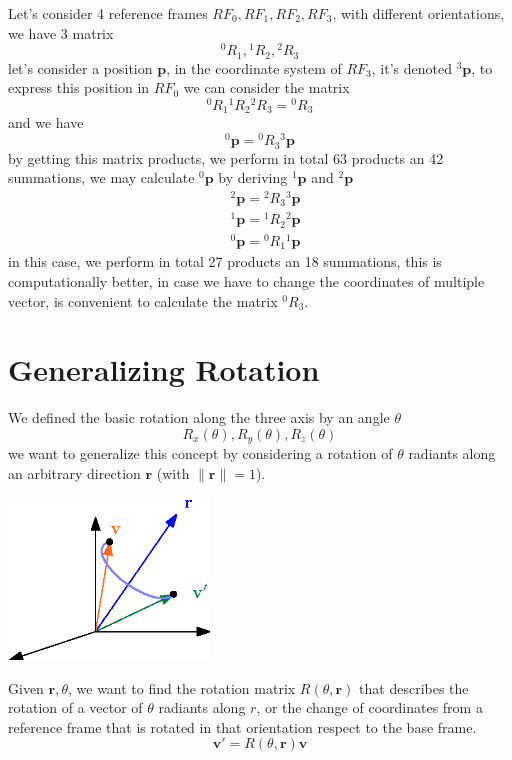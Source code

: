 \documentclass[10pt, letterpaper]{report}
\begin{document}
Let's consider 4 reference frames $RF_0,RF_1,RF_2,RF_3$, with different orientations, we have 3 matrix$${}^0R_1,{}^1R_2,{}^2R_3$$
let's consider a position $\mathbf p$, in the coordinate system of $RF_3$, it's denoted ${}^3\mathbf p$, to express this position in $RF_0$ we can consider the matrix $$ {}^0R_1{}^1R_2{}^2R_3={}^0R_3$$
and we have$$ {}^0\mathbf p={}^0R_3{}^3\mathbf p$$
by getting this matrix products, we perform in total 63 products an 42 summations, we may calculate $ {}^0\mathbf p$ by deriving ${}^1\mathbf p$ and ${}^2\mathbf p$\begin{align}
    &{}^2\mathbf p = {}^2R_3{}^3\mathbf p\\ 
    &{}^1\mathbf p = {}^1R_2{}^2\mathbf p\\ 
    &{}^0\mathbf p = {}^0R_1{}^1\mathbf p
\end{align}
in this case, we perform in total 27 products an 18 summations, this is computationally better, in case we have to change the coordinates of multiple vector, is convenient to calculate the matrix ${}^0R_3$.
\section{Generalizing Rotation}
We defined the basic rotation along the three axis by an angle $\theta$\begin{equation}
    R_x(\theta),R_y(\theta),R_z(\theta)
\end{equation}
we want to generalize this concept by considering a rotation of $\theta$ radiants along an arbitrary direction $\mathbf r$ (with $\|\mathbf r\|=1$).
\begin{center}
    \includegraphics[width=0.4\textwidth ]{images/rotation.eps}
\end{center}
Given $\mathbf r,\theta$, we want to find the rotation matrix $R(\theta,\mathbf r)$ that describes the rotation of a vector of $\theta$ radiants along $r$, or the change of coordinates from a reference frame that is rotated in that orientation respect to the base frame.\begin{equation}
    \mathbf v'=R(\theta,\mathbf r)\mathbf v
\end{equation}
\end{document}
